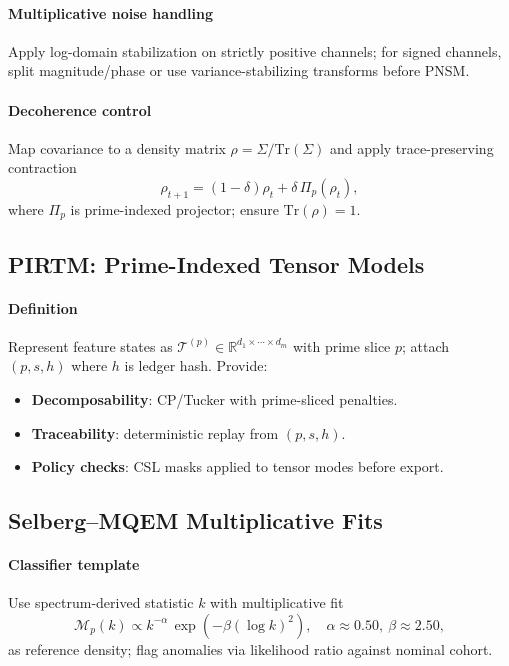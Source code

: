 \documentclass[11pt]{article}
\theoremstyle{plain}
\begin{document}
\paragraph{Multiplicative noise handling}
Apply log-domain stabilization on strictly positive channels; for signed channels, split magnitude/phase or use variance-stabilizing transforms before PNSM.

\paragraph{Decoherence control}
Map covariance to a density matrix $\rho=\Sigma/\mathrm{Tr}(\Sigma)$ and apply trace-preserving contraction
\[
\rho_{t+1}=(1{-}\delta)\rho_t+\delta\,\Pi_p(\rho_t),
\]
where $\Pi_p$ is prime-indexed projector; ensure $\mathrm{Tr}(\rho)=1$.

\subsection{PIRTM: Prime-Indexed Tensor Models}
\paragraph{Definition}
Represent feature states as $\mathcal{T}^{(p)}\in\mathbb{R}^{d_1\times\cdots\times d_m}$ with prime slice $p$; attach $(p,s,h)$ where $h$ is ledger hash. Provide:
\begin{itemize}
  \item \textbf{Decomposability}: CP/Tucker with prime-sliced penalties.
  \item \textbf{Traceability}: deterministic replay from $(p,s,h)$.
  \item \textbf{Policy checks}: CSL masks applied to tensor modes before export.
\end{itemize}

\subsection{Selberg--MQEM Multiplicative Fits}
\paragraph{Classifier template}
Use spectrum-derived statistic $k$ with multiplicative fit
\[
\mathcal{M}_p(k)\propto k^{-\alpha}\,\exp\!\left(-\beta(\log k)^2\right),
\quad \alpha\approx 0.50,\ \beta\approx 2.50,
\]
as reference density; flag anomalies via likelihood ratio against nominal cohort.
\end{document}
